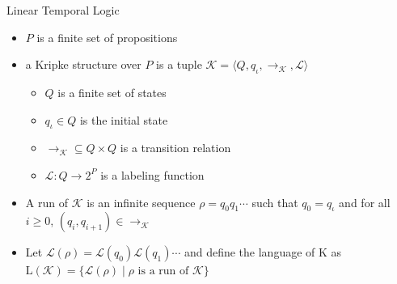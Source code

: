 \documentclass[12pt]{beamer}
\begin{document}
\begin{frame}{Linear Temporal Logic}
	\begin{itemize}
		\item $P$ is a finite set of propositions
		\item a Kripke structure over
$P$ is a tuple $\mathcal{K} = \langle Q, q_{\iota}, \rightarrow_{\mathcal{K}}, \mathcal{L} \rangle$
		\begin{itemize}
			\item $Q$ is a finite set of states	
			\item $q_{\iota} \in Q$ is the initial state
			\item $\rightarrow_{\mathcal{K}} \subseteq Q \times Q$ is a transition relation
			\item $\mathcal{L} : Q \to 2^{P}$ is a labeling function
		\end{itemize}
		\item A run of $\mathcal{K}$ is an infinite sequence $\rho = q_{0}q_{1}\cdots$ such that $q_{0} = q_{\iota}$ and for all $i \geq 0$, $(q_{i}, q_{i+1}) \in \rightarrow_{\mathcal{K}}$
		\item Let $\mathcal{L}(\rho) = \mathcal{L}(q_{0})\mathcal{L}(q_{1})\cdots$ and define the language of K as $\text{L}(\mathcal{K}) =
\{\mathcal{L}(\rho) \mid \rho \text{ is a run of } \mathcal{K}\}$
	\end{itemize}
\end{frame}
\end{document}
